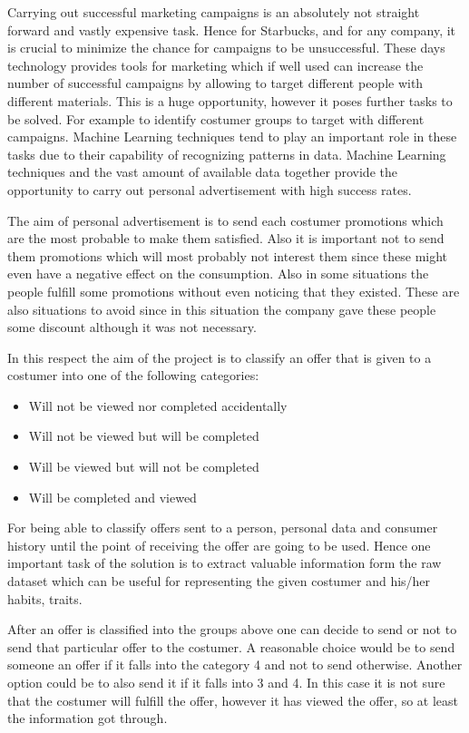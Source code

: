 Carrying out successful marketing campaigns is an absolutely not straight forward and vastly expensive task. Hence for Starbucks, and for any company, it is crucial to minimize the chance for campaigns to be unsuccessful. These days technology provides tools for marketing which if well used can increase the number of successful campaigns by allowing to target different people with different materials. This is a huge opportunity, however it poses further tasks to be solved. For example to identify costumer groups to target with different campaigns. Machine Learning techniques tend to play an important role in these tasks due to their capability of recognizing patterns in data. Machine Learning techniques and the vast amount of available data together provide the opportunity to carry out personal advertisement with high success rates.

The aim of personal advertisement is to send each costumer promotions which are the most probable to make them satisfied. Also it is important not to send them promotions which will most probably not interest them since these might even have a negative effect on the consumption. Also in some situations the people fulfill some promotions without even noticing that they existed. These are also situations to avoid since in this situation the company gave these people some discount although it was not necessary.

In this respect the aim of the project is to classify an offer that is given to a costumer into one of the following categories:
\begin{itemize}
	\item Will not be viewed nor completed accidentally
	\item Will not be viewed but will be completed
	\item Will be viewed but will not be completed
	\item Will be completed and viewed
\end{itemize}

For being able to classify offers sent to a person, personal data and consumer history until the point of receiving the offer are going to be used. Hence one important task of the solution is to extract valuable information form the raw dataset which can be useful for representing the given costumer and his/her habits, traits.

After an offer is classified into the groups above one can decide to send or not to send that particular offer to the costumer. A reasonable choice would be to send someone an offer if it falls into the category 4 and not to send otherwise. Another option could be to also send it if it falls into 3 and 4. In this case it is not sure that the costumer will fulfill the offer, however it has viewed the offer, so at least the information got through.

